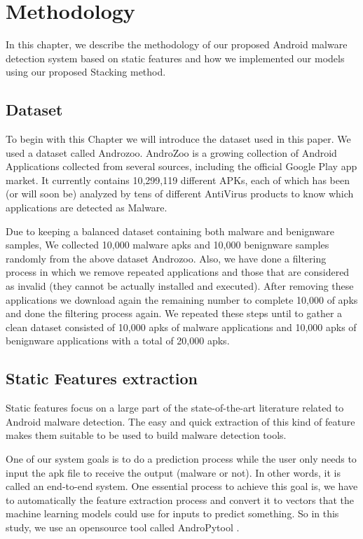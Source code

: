 \chapter{Methodology}

In this chapter, we describe the methodology of our proposed Android malware detection system based on static features and how we implemented our models using our proposed Stacking method.

\section{Dataset}

To begin with this Chapter we will introduce the dataset used in this paper. We used a dataset called Androzoo.
AndroZoo is a growing collection of Android Applications collected from several sources, including the official Google Play app market.
It currently contains 10,299,119 different APKs, each of which has been (or will soon be) analyzed by tens of different AntiVirus products to know which applications are detected as Malware\cite{androzoo}.

Due to keeping a balanced dataset containing both malware and benignware samples,
We collected 10,000 malware \ac{apk}s and 10,000 benignware samples randomly from the above dataset Androzoo. Also, we have done a filtering process in which we remove repeated applications and those that are considered as invalid (they cannot be actually installed and executed). After removing these applications we download again the remaining number to complete 10,000 of \ac{apk}s and done the filtering process again. We repeated these steps until to gather a clean dataset consisted of 10,000 \ac{apk}s of malware applications and 10,000 \ac{apk}s of benignware applications with a total of 20,000 \ac{apk}s.

\section{Static Features extraction}

Static features focus on a large part of the state-of-the-art literature related to Android malware
detection. The easy and quick extraction of this kind of feature makes them suitable to be used to build malware detection tools.

One of our system goals is to do a prediction process while the user only needs to input the \ac{apk} file to receive the output (malware or not). In other words, it is called an end-to-end system. One essential process to achieve this goal is, we have to automatically the feature extraction process and convert it to vectors that the machine learning models could use for inputs to predict something.
So in this study, we use an opensource tool called AndroPytool \cite{andropytool}.

